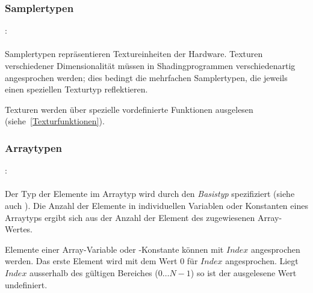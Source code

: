 
\subsubsection{Samplertypen}\label{Samplertypen}
:\label{typ_sampler}\\
\hspace*{1cm}\\

Samplertypen repräsentieren Textureinheiten der Hardware. Texturen verschiedener
Dimensionalität müssen in Shadingprogrammen verschiedenartig angesprochen werden;
dies bedingt die mehrfachen Samplertypen, die jeweils einen speziellen Texturtyp
reflektieren.

Texturen werden über spezielle vordefinierte Funktionen ausgelesen (siehe~\ref{Texturfunktionen}).


\subsubsection{Arraytypen}\label{Arraytypen}
:\label{typ_suffix_array}\\
\hspace*{1cm}\Gt{[}\Gspace\Gt{]}\Gspace{}\\

Der Typ der Elemente im Arraytyp wird durch den \emph{Basistyp} spezifiziert (siehe auch ).
Die Anzahl der Elemente in individuellen Variablen oder Konstanten eines Arraytyps
ergibt sich aus der Anzahl der Element des zugewiesenen Array-Wertes.

Elemente einer Array-Variable oder -Konstante können mit \ident{Bezeichner[}$\mathit{Index}$\ident{]} angesprochen
werden. Das erste Element wird mit dem Wert $0$ für $\mathit{Index}$ angesprochen.
Liegt $\mathit{Index}$ ausserhalb des gültigen Bereiches ($0\dots{}N-1$) so ist der ausgelesene Wert
undefiniert.


